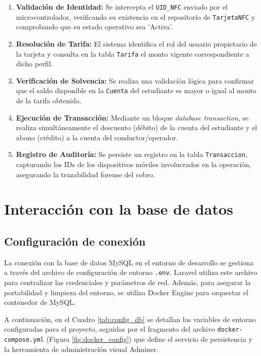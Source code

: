 \documentclass[12pt,letterpaper]{report}
\begin{document}
	\begin{enumerate}
		\item \textbf{Validación de Identidad:} Se intercepta el \texttt{UID\_NFC} enviado por el microcontrolador, verificando su existencia en el repositorio de \texttt{TarjetaNFC} y comprobando que su estado operativo sea 'Activa'.
		\item \textbf{Resolución de Tarifa:} El sistema identifica el rol del usuario propietario de la tarjeta y consulta en la tabla \texttt{Tarifa} el monto vigente correspondiente a dicho perfil.
		\item \textbf{Verificación de Solvencia:} Se realiza una validación lógica para confirmar que el saldo disponible en la \texttt{Cuenta} del estudiante es mayor o igual al monto de la tarifa obtenida.
		\item \textbf{Ejecución de Transacción:} Mediante un bloque \textit{database transaction}, se realiza simultáneamente el descuento (débito) de la cuenta del estudiante y el abono (crédito) a la cuenta del conductor/operador.
		\item \textbf{Registro de Auditoría:} Se persiste un registro en la tabla \texttt{Transaccion}, capturando los IDs de los dispositivos móviles involucrados en la operación, asegurando la trazabilidad forense del cobro.
	\end{enumerate}
	
	\section{Interacción con la base de datos}
	\subsection{Configuración de conexión}
	La conexión con la base de datos MySQL en el entorno de desarrollo se gestiona a través del archivo de configuración de entorno \texttt{.env}. Laravel utiliza este archivo para centralizar las credenciales y parámetros de red. Además, para asegurar la portabilidad y limpieza del entorno, se utiliza Docker Engine para orquestar el contenedor de MySQL. 
	
	A continuación, en el Cuadro \ref{tab:config_db} se detallan las variables de entorno configuradas para el proyecto, seguidas por el fragmento del archivo \texttt{docker-compose.yml} (Figura \ref{fig:docker_config}) que define el servicio de persistencia y la herramienta de administración visual Adminer.
	
\end{document}
